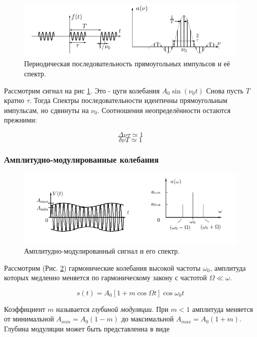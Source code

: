 \documentclass{article}
\begin{document}
\begin{figure}[H]
    \centering
    \includegraphics[width=\textwidth]{cug_imp_example.png}
    \caption{Периодическая последовательность прямоугольных импульсов и её спектр.} 
    \label{cug_imp_example}
\end{figure}

Рассмотрим сигнал на рис \ref{cug_imp_example}. Это - цуги колебания \( A_0 \sin \left(\nu_0t\right) \)
Снова пусть $T$ кратно $\tau$. Тогда Спектры последовательности идентичны прямоугольным импульсам, но
сдвинуты на $\nu_0$. Соотношения неопределённости остаются прежними:

\[ \Delta\nu\tau \simeq 1 \]
\[ \delta\nu T \simeq 1 \]

\subsubsection{Амплитудно-модулированные колебания}
\begin{figure}[H]
    \centering
    \includegraphics[width=\textwidth]{AM_signal_example.png}
    \caption{Амплитудно-модулированный сигнал и его спектр.} 
    \label{AM_sig_example}
\end{figure}

Рассмотрим (Рис. \ref{AM_sig_example}) гармонические колебания высокой частоты $\omega_0$, амплитуда которых
медленно меняется по гармоническому закону с частотой $\Omega \ll \omega$.

\[ s(t) = A_0\left[1 + m \cos \Omega t\right] \cos \omega_0 t \]

Коэффициент $m$ называется \emph{глубиной модуляции}. При \( m < 1 \) амплитуда меняется от минимальной 
\( A_{min} = A_0(1 - m) \) до максимальной \( A_{max} = A_0(1 + m) \). Глубина модуляции может быть представленна
в виде
\end{document}
